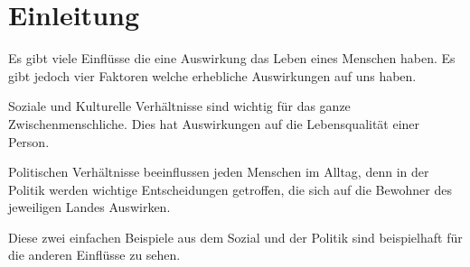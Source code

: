 \section{Einleitung}
Es gibt viele Einflüsse die eine Auswirkung das Leben eines Menschen haben.
Es gibt jedoch vier Faktoren welche erhebliche Auswirkungen auf uns haben.

\begin{figurewrapper}
\end{figurewrapper}

Soziale und Kulturelle Verhältnisse sind wichtig für das ganze Zwischenmenschliche.
Dies hat Auswirkungen auf die Lebensqualität  einer Person.

Politischen Verhältnisse beeinflussen jeden Menschen im Alltag,
denn in der Politik werden wichtige Entscheidungen getroffen,
die sich auf die Bewohner des jeweiligen Landes Auswirken.

Diese zwei einfachen Beispiele aus dem Sozial und der Politik sind beispielhaft für die
anderen Einflüsse zu sehen.

